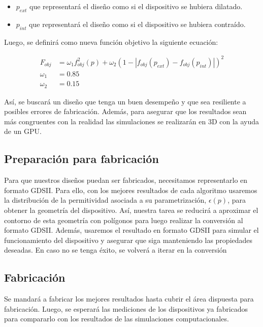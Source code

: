 \begin{itemize}
  \item $p_{ext}$ que representará el diseño como si el dispositivo se hubiera dilatado.
  \item $p_{int}$ que representará el diseño como si el dispositivo se hubiera contraído.
\end{itemize}

Luego, se definirá como nueva función objetivo la siguiente ecuación:

\begin{equation}
  \begin{split}
    F_{obj} &= \omega_1 f^2_{obj}(p) + \omega_2 (1 - |f_{obj}(p_{ext}) - f_{obj}(p_{int})|)^2\\
    \omega_1 &= 0.85\\
    \omega_2 &= 0.15
  \end{split}
  \label{eq:final-fom}
\end{equation}

Así, se buscará un diseño que tenga un buen desempeño y que sea resiliente a posibles errores de fabricación.
Además, para asegurar que los resultados sean más congruentes con la realidad las simulaciones se realizarán en 3D con la ayuda de un GPU.

\subsection{Preparación para fabricación}

Para que nuestros diseños puedan ser fabricados, necesitamos representarlo en formato GDSII.
Para ello, con los mejores resultados de cada algoritmo usaremos la distribución de la permitividad asociada a su parametrización, $\epsilon(p)$,
para obtener la geometría del dispositivo.
Así, nuestra tarea se reducirá a aproximar el contorno de esta geometría con polígonos para luego realizar la conversión al formato GDSII.
Además, usaremos el resultado en formato GDSII para simular el funcionamiento del dispositivo y asegurar que siga manteniendo las propiedades deseadas.
En caso no se tenga éxito, se volverá a iterar en la conversión

\subsection{Fabricación}

Se mandará a fabricar los mejores resultados hasta cubrir el área dispuesta para fabricación. 
Luego, se esperará las mediciones de los dispositivos ya fabricados para compararlo con los resultados de las simulaciones computacionales.

